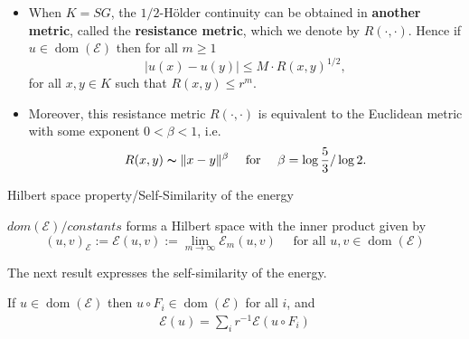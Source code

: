 \begin{frame}
\begin{itemize}
\item When $K=SG$, the $1/2$-Hölder continuity can be obtained in \textbf{another metric}, called the \textbf{resistance metric}, which we denote by $R(\cdot,\cdot)$. Hence if $u\in \operatorname{dom}(\mathcal{E})$ then for all $m\geq 1$
\begin{equation}
    \lvert u(x)-u(y)\rvert \leq M\cdot R(x,y)^{1/2}, 
\end{equation}
for all $x,y \in K$ such that $R(x,y)\leq r^{m}$.

\item Moreover, this resistance metric $R(\cdot,\cdot)$ is equivalent to the Euclidean metric with some exponent $0<\beta<1$, i.e. 
\begin{equation}
R(x,y)\thicksim \lVert x-y \rVert^{\beta} \quad \text{ for } \quad \beta=\log \frac{5}{3}/\log 2. 
\end{equation}
\end{itemize}
\end{frame}

\begin{frame}{Hilbert space property/Self-Similarity of the energy}
\begin{theorem}
    $dom(\mathcal{E})/constants$ forms a Hilbert space with the inner product given by 
    \begin{equation}\label{inner prod}
        (u,v)_{\mathcal{E}}:=\mathcal{E}(u,v):=\lim_{m\rightarrow \infty}\mathcal{E}_m(u,v) \quad \text{ for all } u,v \in \operatorname{dom}(\mathcal{E})
    \end{equation}
\end{theorem}
The next result expresses the self-similarity of the energy.
\begin{theorem}
If $u \in \operatorname{dom}(\mathcal{E})$ then $u \circ F_i \in \operatorname{dom}(\mathcal{E})$ for all $i$, and
\begin{align}\label{self-sim energy}
    \mathcal{E}(u)=\sum_i r^{-1} \mathcal{E}\left(u \circ F_i\right)
\end{align}
\end{theorem}
\end{frame}


